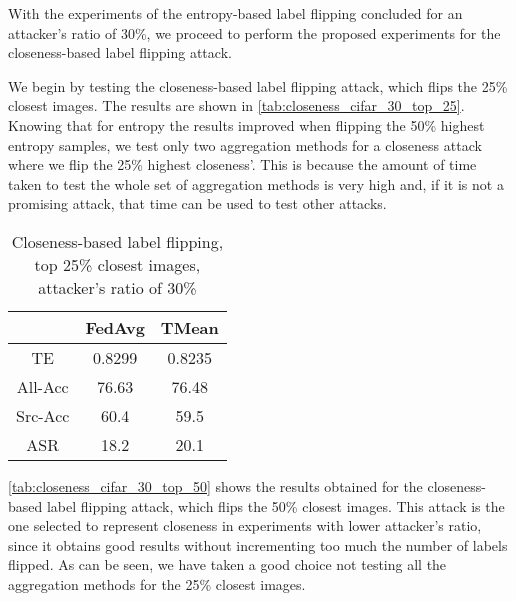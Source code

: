 With the experiments of the entropy-based label flipping concluded for an attacker's ratio of 30\%, we proceed to perform the proposed experiments for the closeness-based label flipping attack.

We begin by testing the closeness-based label flipping attack, which flips the 25\% closest images. The results are shown in \autoref{tab:closeness_cifar_30_top_25}. Knowing that for entropy the results improved when flipping the 50\% highest entropy samples, we test only two aggregation methods for a closeness attack where we flip the 25\% highest closeness'. This is because the amount of time taken to test the whole set of aggregation methods is very high and, if it is not a promising attack, that time can be used to test other attacks.

\begin{table}[h!]
        \centering
        \small
        \begin{adjustbox}{center}
        \begin{tabular}{|c|c|c|}
            \hline
            & FedAvg & TMean \\
            \hline
            TE & 0.8299 & 0.8235 \\
            \hline
            All-Acc & 76.63 & 76.48 \\
            \hline
            Src-Acc & 60.4 & 59.5 \\
            \hline
            ASR & 18.2 & 20.1 \\
            \hline
        \end{tabular}
        \end{adjustbox}
        \caption{Closeness-based label flipping, top 25\% closest images, attacker's ratio of 30\%}
        \label{tab:closeness_cifar_30_top_25}
    \end{table}


\autoref{tab:closeness_cifar_30_top_50} shows the results obtained for the closeness-based label flipping attack, which flips the 50\% closest images. This attack is the one selected to represent closeness in experiments with lower attacker's ratio, since it obtains good results without incrementing too much the number of labels flipped. As can be seen, we have taken a good choice not testing all the aggregation methods for the 25\% closest images.

